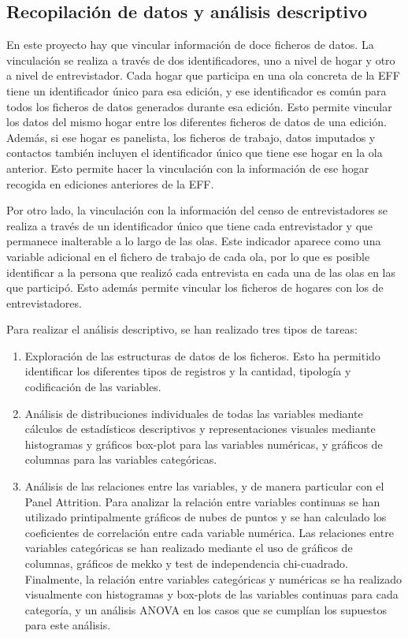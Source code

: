 \subsection*{Recopilación de datos y análisis descriptivo}

En este proyecto hay que vincular información de doce ficheros de datos. La vinculación se realiza a través de dos identificadores, uno a nivel de hogar y otro a nivel de entrevistador. Cada hogar que participa en una ola concreta de la EFF tiene un identificador único para esa edición, y ese identificador es común para todos los ficheros de datos generados durante esa edición. Esto permite vincular los datos del mismo hogar entre los diferentes ficheros de datos de una edición. Además, si ese hogar es panelista, los ficheros de trabajo, datos imputados y contactos también incluyen el identificador único que tiene ese hogar en la ola anterior. Esto permite hacer la vinculación con la información de ese hogar recogida en ediciones anteriores de la EFF.

Por otro lado, la vinculación con la información del censo de entrevistadores se realiza a través de un identificador único que tiene cada entrevistador y que permanece inalterable a lo largo de las olas. Este indicador aparece como una variable adicional en el fichero de trabajo de cada ola, por lo que es posible identificar a la persona que realizó cada entrevista en cada una de las olas en las que participó. Esto además permite vincular los ficheros de hogares con los de entrevistadores.

Para realizar el análisis descriptivo, se han realizado tres tipos de tareas:
\begin{enumerate}[noitemsep]
    \item Exploración de las estructuras de datos de los ficheros. Esto ha permitido identificar los diferentes tipos de registros y la cantidad, tipología y codificación de las variables.
    \item Análisis de distribuciones individuales de todas las variables mediante cálculos de estadísticos descriptivos y representaciones visuales mediante histogramas y gráficos box-plot para las variables numéricas, y gráficos de columnas para las variables categóricas.
    \item Análisis de las relaciones entre las variables, y de manera particular con el Panel Attrition. Para analizar la relación entre variables continuas se han utilizado printipalmente gráficos de nubes de puntos y se han calculado los coeficientes de correlación entre cada variable numérica. Las relaciones entre variables categóricas se han realizado mediante el uso de gráficos de columnas, gráficos de mekko y test de independencia chi-cuadrado. Finalmente, la relación entre variables categóricas y numéricas se ha realizado visualmente con histogramas y box-plots de las variables continuas para cada categoría, y un análisis ANOVA en los casos que se cumplían los supuestos para este análisis.
\end{enumerate}


